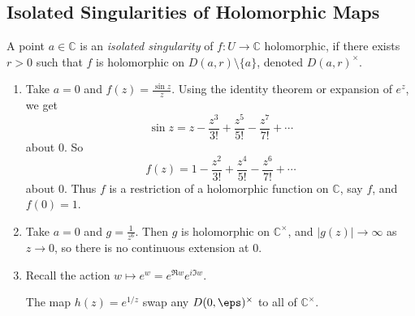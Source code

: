 \documentclass[12pt]{article}
\begin{document}
\subsection{Isolated Singularities of Holomorphic Maps}
\label{sub:isolated_singularities_of_holomorphic_maps}

\begin{definition}
	A point $a \in \mathbb{C}$ is an \emph{isolated singularity} of $f : U \to \mathbb{C}$ holomorphic, if there exists $r > 0$ such that $f$ is holomorphic on $D(a, r) \setminus \{a\}$, denoted $D(a, r)^{\times}$.
\end{definition}

\begin{exbox}
	\begin{enumerate}
		\item Take $a = 0$ and $f(z) = \frac{\sin z}{z}$. Using the identity theorem or expansion of $e^{z}$, we get
			\[
				\sin z = z - \frac{z^3}{3!} + \frac{z^{5}}{5!} - \frac{z^{7}}{7!} + \cdots
			\]
			about $0$. So
			\[
			f(z) = 1 - \frac{z^2}{3!} + \frac{z^4}{5!} - \frac{z^6}{7!} + \cdots
			\]
			about $0$. Thus $f$ is a restriction of a holomorphic function on $\mathbb{C}$, say $f$, and $f(0) = 1$.
		\item Take $a=  0$ and $g = \frac{1}{z^{6}}$. Then $g$ is holomorphic on $\mathbb{C}^{\times}$, and $|g(z)| \to \infty$ as $z \to 0$, so there is no continuous extension at $0$.
		\item Recall the action $w \mapsto e^{w} = e^{\Re w} e^{i \Im w}$.

			The map $h(z) = e^{1/z}$ swap any $D(0, \eps)^{\times}$ to all of $\mathbb{C}^\times$.
	\end{enumerate}
	
\end{exbox}


\newpage

\printindex
\end{document}
